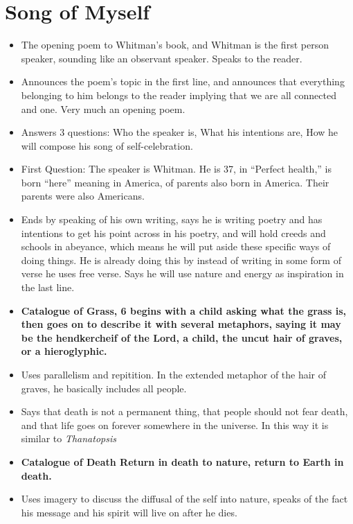 \documentclass[10pt]{article}
\begin{document}
\section{Song of Myself}
\begin{itemize}
	\item The opening poem to Whitman's book, and Whitman is the first 
		person speaker, sounding like an observant speaker.  Speaks to the reader.  
	\item Announces the poem's topic in the first line, and announces that 
		everything belonging to him belongs to the reader implying 
		that we are all connected and one.  Very much an opening poem.
	\item Answers 3 questions: Who the speaker is, What his intentions 
		are, How he will compose his song of self-celebration.
	\item First Question: The speaker is Whitman.  He is 37, in ``Perfect 
		health,'' is born ``here'' meaning in America, of parents also 
		born in America.  Their parents were also Americans.
	\item Ends by speaking of his own writing, says he is writing poetry 
		and has intentions to get his point across in his poetry, and 
		will hold creeds and schools in abeyance, which means he will 
		put aside these specific ways of doing things.  He is already 
		doing this by instead of writing in some form of verse he uses 
		free verse.  Says he will use nature and energy as inspiration 
		in the last line.
	\item \bf{Catalogue of Grass, 6}
		begins with a child asking what the grass is, then goes on to 
		describe it with several metaphors, saying it may be the 
		hendkercheif of the Lord, a child, the uncut hair of graves, 
		or a hieroglyphic.  
	\item Uses parallelism and repitition.  In the extended metaphor of 
		the hair of graves, he basically includes all people.
	\item Says that death is not a permanent thing, that people should not 
		fear death, and that life goes on forever somewhere in the 
		universe.  In this way it is similar to \it{Thanatopsis}
	\item \bf{Catalogue of Death}
		Return in death to nature, return to Earth in death.
	\item Uses imagery to discuss the diffusal of the self into nature, 
		speaks of the fact his message and his spirit will live on after he dies.
\end{itemize}
\end{document}
